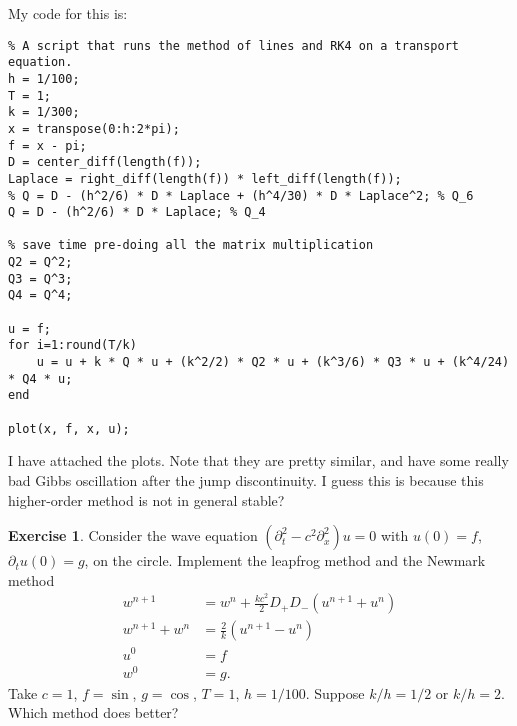 \documentclass[10pt]{article}
\theoremstyle{definition}
\newtheorem{exer}{Exercise}
\begin{document}
My code for this is:
\begin{verbatim}
% A script that runs the method of lines and RK4 on a transport equation.
h = 1/100;
T = 1;
k = 1/300;
x = transpose(0:h:2*pi);
f = x - pi;
D = center_diff(length(f));
Laplace = right_diff(length(f)) * left_diff(length(f));
% Q = D - (h^2/6) * D * Laplace + (h^4/30) * D * Laplace^2; % Q_6
Q = D - (h^2/6) * D * Laplace; % Q_4

% save time pre-doing all the matrix multiplication
Q2 = Q^2;
Q3 = Q^3;
Q4 = Q^4;

u = f;
for i=1:round(T/k)
    u = u + k * Q * u + (k^2/2) * Q2 * u + (k^3/6) * Q3 * u + (k^4/24) * Q4 * u;
end

plot(x, f, x, u);
\end{verbatim}

I have attached the plots. Note that they are pretty similar, and have some really bad Gibbs oscillation after the jump discontinuity.
I guess this is because this higher-order method is not in general stable?

\begin{exer}
Consider the wave equation $(\partial_t^2 - c^2 \partial_x^2)u = 0$ with $u(0) = f$, $\partial_t u(0) = g$, on the circle.
Implement the leapfrog method and the Newmark method
\begin{align*}
w^{n+1} &= w^n + \frac{kc^2}{2} D_+ D_-(u^{n + 1} + u^n)\\
w^{n+1} + w^n &= \frac{2}{k}(u^{n + 1} - u^n)\\
u^0 &= f\\
w^0 &= g.
\end{align*}
Take $c = 1$, $f = \sin$, $g = \cos$, $T = 1$, $h = 1/100$.
Suppose $k/h = 1/2$ or $k/h = 2$.
Which method does better?
\end{exer}
\end{document}
